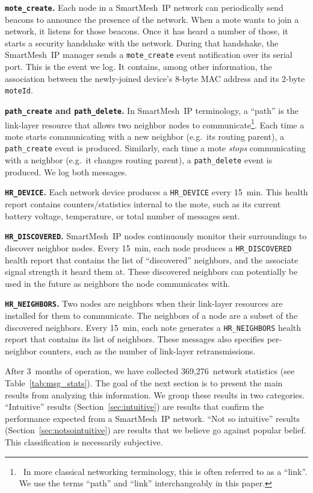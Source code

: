 \documentclass{sig-alternate}
\newcommand{\smip}                {SmartMesh~IP\xspace}
\newcommand{\HRNEIGHBORS}         {{\tt HR\_NEIGHBORS}\xspace}
\newcommand{\HRDISCOVERED}        {{\tt HR\_DISCOVERED}\xspace}
\newcommand{\HRDEVICE}            {{\tt HR\_DEVICE}\xspace}
\newcommand{\pathcreate}          {{\tt path\_create}\xspace}
\newcommand{\pathdelete}          {{\tt path\_delete}\xspace}
\newcommand{\motecreate}          {{\tt mote\_create}\xspace}
\newcommand{\moteId}              {{\tt moteId}\xspace}
\begin{document}
\textbf{\motecreate.}
Each node in a \smip network can periodically send beacons to announce the presence of the network.
When a mote wants to join a network, it listens for those beacons.
Once it has heard a number of those, it starts a security handshake with the network.
During that handshake, the \smip manager sends a \motecreate event notification over its serial port.
This is the event we log.
It contains, among other information, the association between the newly-joined device's 8-byte MAC address and its 2-byte \moteId.

\textbf{\pathcreate and \pathdelete.}
In \smip terminology, a ``path'' is the link-layer resource that allows two neighbor nodes to communicate\footnote{~In more classical networking terminology, this is often referred to as a ``link''. We use the terms ``path'' and ``link'' interchangeably in this paper.}.
Each time a mote starts communicating with a new neighbor (e.g.~its routing parent), a \pathcreate event is produced.
Similarly, each time a mote \textit{stops} communicating with a neighbor (e.g.~it changes routing parent), a \pathdelete event is produced.
We log both messages.

\textbf{\HRDEVICE.}
Each network device produces a \HRDEVICE every 15~min.
This health report contains counters/statistics internal to the mote, such as its current battery voltage, temperature, or total number of messages sent.

\textbf{\HRDISCOVERED.}
\smip nodes continuously monitor their surroundings to discover neighbor nodes.
Every 15~min, each node produces a \HRDISCOVERED health report that contains the list of ``discovered'' neighbors, and the associate signal strength it heard them at.
These discovered neighbors can potentially be used in the future as neighbors the node communicates with.

\textbf{\HRNEIGHBORS.}
Two nodes are neighbors when their link-layer resources are installed for them to communicate.
The neighbors of a node are a subset of the discovered neighbors.
Every 15~min, each note generates a \HRNEIGHBORS health report that contains its list of neighbors.
These messages also specifies per-neighbor counters, such as the number of link-layer retransmissions.


After 3~months of operation, we have collected 369,276~network statistics (see Table~\ref{tab:msg_stats}).
The goal of the next section is to present the main results from analyzing this information.
We group these results in two categories.
``Intuitive'' results (Section~\ref{sec:intuitive}) are results that confirm the performance expected from a \smip network.
``Not so intuitive'' results (Section~\ref{sec:notsointuitive}) are results that we believe go against popular belief.
This classification is necessarily subjective.
\end{document}
